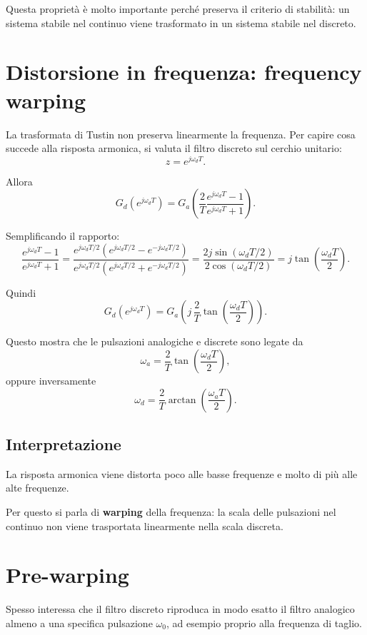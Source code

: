 Questa propriet\`a \`e molto importante perch\'e preserva il criterio di stabilit\`a:
un sistema stabile nel continuo viene trasformato in un sistema stabile nel discreto.

\section{Distorsione in frequenza: frequency warping}

La trasformata di Tustin non preserva linearmente la frequenza.
Per capire cosa succede alla risposta armonica,
si valuta il filtro discreto sul cerchio unitario:
\[
z=e^{j\omega_d T}.
\]

Allora
\[
G_d(e^{j\omega_d T})
=
G_a\!\left(\frac{2}{T}\frac{e^{j\omega_d T}-1}{e^{j\omega_d T}+1}\right).
\]

Semplificando il rapporto:
\[
\frac{e^{j\omega_d T}-1}{e^{j\omega_d T}+1}
=
\frac{e^{j\omega_d T/2}\left(e^{j\omega_d T/2}-e^{-j\omega_d T/2}\right)}
{e^{j\omega_d T/2}\left(e^{j\omega_d T/2}+e^{-j\omega_d T/2}\right)}
=
\frac{2j\sin(\omega_d T/2)}{2\cos(\omega_d T/2)}
=
j\tan\!\left(\frac{\omega_d T}{2}\right).
\]

Quindi
\[
G_d(e^{j\omega_d T})
=
G_a\!\left(
j\,\frac{2}{T}\tan\!\left(\frac{\omega_d T}{2}\right)
\right).
\]

Questo mostra che le pulsazioni analogiche e discrete sono legate da
\[
\omega_a=\frac{2}{T}\tan\!\left(\frac{\omega_d T}{2}\right),
\]
oppure inversamente
\[
\omega_d=\frac{2}{T}\arctan\!\left(\frac{\omega_a T}{2}\right).
\]

\subsection*{Interpretazione}

La risposta armonica viene distorta poco alle basse frequenze
e molto di pi\`u alle alte frequenze.

Per questo si parla di \textbf{warping} della frequenza:
la scala delle pulsazioni nel continuo non viene trasportata linearmente
nella scala discreta.

\section{Pre-warping}

Spesso interessa che il filtro discreto riproduca in modo esatto
il filtro analogico almeno a una specifica pulsazione \(\omega_0\),
ad esempio proprio alla frequenza di taglio.

